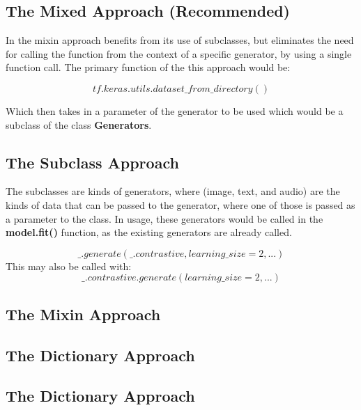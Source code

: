\documentclass[
	letterpaper, %
	10pt, %
	unnumberedsections, %
	twoside, %
]{LTJournalArticle}
\begin{document}
\subsection{The Mixed Approach (Recommended)}
In the mixin approach benefits from its use of subclasses, but eliminates the need for calling the function from the context of a specific generator, by using a single function call.
The primary function of the this approach would be:

\[ tf.keras.utils.dataset\_from\_directory() \]

Which then takes in a parameter of the generator to be used which would be a subclass of the class \textbf{Generators}.

\subsection{The Subclass Approach}
The subclasses are kinds of generators, where (image, text, and audio) are the kinds of data that can be passed to the generator, where one of those is passed as a parameter to the class. In usage, these generators would be called in the \textbf{model.fit()} function, as the existing generators are already called.

\[ \_.generate(\_.contrastive, learning\_size=2, ...) \]
This may also be called with:
\[ \_.contrastive.generate(learning\_size=2, ...) \]

\subsection{The Mixin Approach}


% 
% 
% 
% 
% 

\subsection{The Dictionary Approach}
 
\subsection{The Dictionary Approach}
\end{document}
